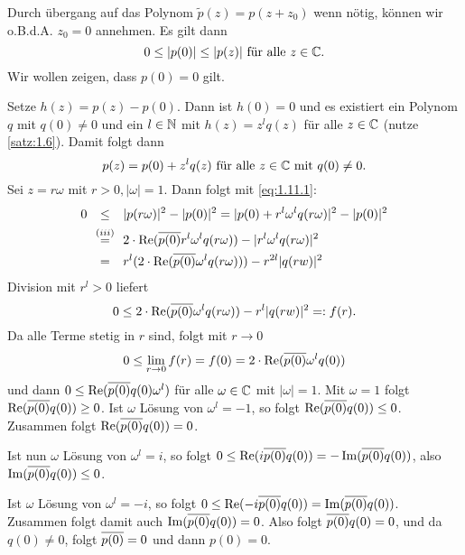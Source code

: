 \begin{beweis}
	Durch übergang auf das Polynom $\tilde{p}(z) = p(z+z_0)$ wenn nötig, können wir o.B.d.A. $z_0 = 0$ annehmen.
	Es gilt dann
	\begin{equation}
		0 \leq |p(0)| \leq |p(z)| \text{ für alle } z \in \mathbb{C}. \label{eq:1.11.1}
	\end{equation}
	Wir wollen zeigen, dass $p(0) = 0$ gilt.
	
	Setze $h(z) = p(z) - p(0)$.
	Dann ist $h(0) = 0$ und es existiert ein Polynom $q$ mit $q(0) \neq 0$ und ein $l \in \mathbb{N}$ mit $h(z) = z^{l} q(z)$ für alle $z \in \mathbb{C}$ (nutze \autoref{satz:1.6}).
	Damit folgt dann
	\[
		p(z) = p(0) + z^{l}q(z) \text{ für alle } z \in \mathbb{C} \text{ mit } q(0) \neq 0.
	\]
	Sei $z = r \omega$ mit $r > 0, |\omega| = 1$.
	Dann folgt mit \eqref{eq:1.11.1}:
	\begin{align*}
		0 &\stack{}{\leq} |p(r \omega)|^2 - |p(0)|^2 = |p(0) + r^{l}\omega^{l}q(r\omega)|^2 - |p(0)|^2 \\
		&\stack{(iii)}{=} 2 \cdot \Re(\ol{p(0)} r^{l} \omega^{l} q(r\omega)) - |r^l \omega^{l} q(r\omega)|^2 \\
		&\stack{}{=} r^{l} (2\cdot \Re(\ol{p(0)} \omega^{l}q(r\omega))) - r^{2l} |q(rw)|^2
	\end{align*}
	Division mit $r^{l} > 0$ liefert
	\[
		0 \leq 2 \cdot \operatorname{Re}(\overline{p(0)}\omega^{l} q(r\omega)) - r^{l} |q(rw)|^2 =: f(r).
	\]
	Da alle Terme stetig in $r$ sind, folgt mit $r \rightarrow 0$
	\[
		0 \leq \lim\limits_{r \rightarrow 0} f(r) = f(0) = 2 \cdot \operatorname{Re}(\overline{p(0)} \omega^l q(0))
	\]
	und dann $0 \leq \operatorname{Re}(\overline{p(0)}q(0) \omega^l)$ für alle $\omega \in \mathbb{C}$ mit $|\omega| = 1$.
	Mit $\omega = 1$ folgt $\operatorname{Re}(\overline{p(0)}q(0)) \geq 0$.
	Ist $\omega$ Lösung von $\omega^l = -1$, so folgt $\operatorname{Re}(\overline{p(0)}q(0)) \leq 0$.
	Zusammen folgt $\operatorname{Re}(\overline{p(0)}q(0))=0$.
	
	Ist nun $\omega$ Lösung von $\omega^l=i$, so folgt $0 \leq \operatorname{Re}(i \overline{p(0)} q(0)) = -\operatorname{Im}(\overline{p(0)}q(0))$, also $\operatorname{Im}(\overline{p(0)}q(0)) \leq 0$.
	
	Ist $\omega$ Lösung von $\omega^l = -i$, so folgt $0 \leq \operatorname{Re}(-i \overline{p(0)} q(0)) = \operatorname{Im}(\overline{p(0)}q(0))$.
	Zusammen folgt damit auch $\operatorname{Im}(\overline{p(0)}q(0)) = 0$.
	Also folgt $\overline{p(0)}q(0)=0$, und da $q(0) \neq 0$, folgt $\overline{p(0)} = 0$ und dann $p(0) = 0$. \qedhere
\end{beweis}
\newpage